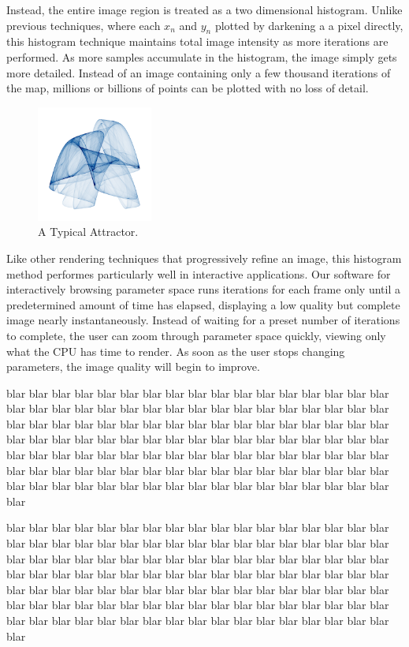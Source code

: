 \documentclass{acmsiggraph}
\begin{document}
Instead, the entire image region is treated as a two dimensional histogram.
Unlike previous techniques, where each $x_n$ and $y_n$ plotted by darkening a
a pixel directly, this histogram technique maintains total image intensity as
more iterations are performed. As more samples accumulate in the histogram,
the image simply gets more detailed. Instead of an image containing only a
few thousand iterations of the map, millions or billions of points can be
plotted with no loss of detail.

\begin{figure}[ht]
\centering
\includegraphics[width=1.5in]{1.png}
\caption{A Typical Attractor.}
\end{figure}

Like other rendering techniques that progressively refine an image, this
histogram method performes particularly well in interactive applications.
Our software for interactively browsing parameter space runs iterations
for each frame only until a predetermined amount of time has elapsed,
displaying a low quality but complete image nearly instantaneously.
Instead of waiting for a preset number of iterations to complete, the user
can zoom through parameter space quickly, viewing only what the CPU has time
to render. As soon as the user stops changing parameters, the image quality
will begin to improve.


blar blar blar blar blar blar blar blar blar blar blar blar blar blar blar
blar blar blar blar blar blar blar blar blar blar blar blar blar blar blar
blar blar blar blar blar blar blar blar blar blar blar blar blar blar blar
blar blar blar blar blar blar blar blar blar blar blar blar blar blar blar
blar blar blar blar blar blar blar blar blar blar blar blar blar blar blar
blar blar blar blar blar blar blar blar blar blar blar blar blar blar blar
blar blar blar blar blar blar blar blar blar blar blar blar blar blar blar
blar blar blar blar blar blar blar blar blar blar blar blar blar blar blar


blar blar blar blar blar blar blar blar blar blar blar blar blar blar blar
blar blar blar blar blar blar blar blar blar blar blar blar blar blar blar
blar blar blar blar blar blar blar blar blar blar blar blar blar blar blar
blar blar blar blar blar blar blar blar blar blar blar blar blar blar blar
blar blar blar blar blar blar blar blar blar blar blar blar blar blar blar
blar blar blar blar blar blar blar blar blar blar blar blar blar blar blar
blar blar blar blar blar blar blar blar blar blar blar blar blar blar blar
blar blar blar blar blar blar blar blar blar blar blar blar blar blar blar
\end{document}
